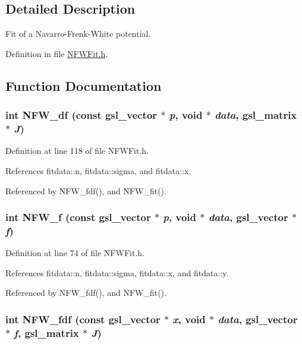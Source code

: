 \subsection{Detailed Description}
Fit of a Navarro-\/Frenk-\/White potential. 

Definition in file \hyperlink{NFWFit_8h_source}{NFWFit.h}.



\subsection{Function Documentation}
\subsubsection[{NFW\_\-df}]{\setlength{\rightskip}{0pt plus 5cm}int NFW\_\-df (const gsl\_\-vector $\ast$ {\em p}, \/  void $\ast$ {\em data}, \/  gsl\_\-matrix $\ast$ {\em J})}\label{NFWFit_8h_af063c71a242be61173b55045d393d7d3}


Definition at line 118 of file NFWFit.h.



References fitdata::n, fitdata::sigma, and fitdata::x.



Referenced by NFW\_\-fdf(), and NFW\_\-fit().

\subsubsection[{NFW\_\-f}]{\setlength{\rightskip}{0pt plus 5cm}int NFW\_\-f (const gsl\_\-vector $\ast$ {\em p}, \/  void $\ast$ {\em data}, \/  gsl\_\-vector $\ast$ {\em f})}\label{NFWFit_8h_a1ac3fd28f4c33bbdd041f20032d550ab}


Definition at line 74 of file NFWFit.h.



References fitdata::n, fitdata::sigma, fitdata::x, and fitdata::y.



Referenced by NFW\_\-fdf(), and NFW\_\-fit().

\subsubsection[{NFW\_\-fdf}]{\setlength{\rightskip}{0pt plus 5cm}int NFW\_\-fdf (const gsl\_\-vector $\ast$ {\em x}, \/  void $\ast$ {\em data}, \/  gsl\_\-vector $\ast$ {\em f}, \/  gsl\_\-matrix $\ast$ {\em J})}\label{NFWFit_8h_aa0c7a0983feb99926dac2c9a1782b548}


